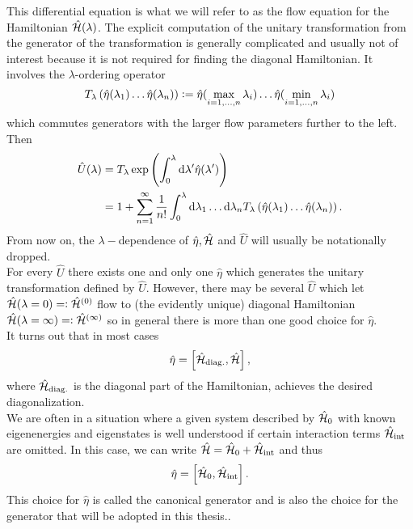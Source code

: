 This differential equation is what we will refer to as the flow equation for the Hamiltonian $\hat{\mathcal{H}} (\lambda)$. 
The explicit computation of the unitary transformation from the generator of the transformation is generally complicated and usually not of interest because it is not required for finding the diagonal Hamiltonian. It involves the $\lambda$-ordering operator 
\begin{equation}
T_\lambda\left(\hat\eta(\lambda_1)\ldots\hat\eta(\lambda_n)\right)\vcentcolon=\hat\eta(\max\limits_{i=1,\ldots,n}\lambda_i)\ldots\hat\eta(\min\limits_{i=1,\ldots,n}\lambda_i)
\end{equation}
which commutes generators with the larger flow parameters further to the left.
Then 
\begin{align}
\hat U(\lambda)&=T_\lambda\exp\left(\int_0^\lambda\mathrm d\lambda^\prime \hat\eta(\lambda^\prime)\right)\\
&=1+\sum\limits_{n=1}^\infty \frac1{n!}\int_0^\lambda\mathrm d\lambda_1\ldots\mathrm d\lambda_nT_\lambda\left(\hat\eta(\lambda_1)\ldots\hat\eta(\lambda_n)\right).
\end{align}
From now on, the $\lambda-$dependence of $\hat\eta,\hat{\mathcal{H}}$ and $\hat U$ will usually be notationally dropped. \\
For every $\hat U$ there exists one and only one $\hat\eta$ which generates the unitary transformation defined by $\hat U$. However, there may be several $\hat U$ which let $\hat{\mathcal{H}}(\lambda = 0)=\vcentcolon \hat{\mathcal{H}}^{(0)}$ flow to (the evidently unique) diagonal Hamiltonian $\hat{\mathcal{H}}(\lambda=\infty)=\vcentcolon \hat{\mathcal{H}}^{(\infty)}$ so in general there is more than one good choice for $\hat\eta$. \\
It turns out that in most cases 
\begin{equation}\label{FEQ_eta_def}
\hat\eta = \left[\hat{\mathcal{H}}_{\mathrm{diag.}},\hat{\mathcal{H}} \right],
\end{equation}
where $\hat{\mathcal{H}}_{\mathrm{diag.}}$ is the diagonal part of the Hamiltonian, achieves the desired diagonalization.  \\
We are often in a situation where a given system described by $\hat{\mathcal{H}}_0$ with known eigenenergies  and eigenstates is well understood if certain interaction terms $\hat{\mathcal{H}}_{\mathrm{int}}$ are omitted. In this case, we can write $\hat{\mathcal{H}} = \hat{\mathcal{H}}_0 + \hat{\mathcal{H}}_{\mathrm{int}}$ and thus
\begin{equation}\label{FEQ_can_eta_def}
\hat\eta = \left[\hat{\mathcal{H}}_0, \hat{\mathcal{H}}_{\mathrm{int}}\right].
\end{equation}
This choice for $\hat \eta$ is called the canonical generator and is also the choice for the generator that will be adopted in this thesis.. \\
